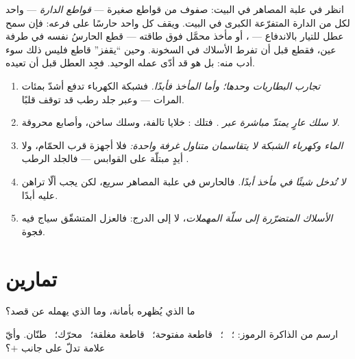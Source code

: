 \begin{remark}[حرّاس البيت]\label{rem:g6:circuits-and-safety:guards}
انظر في علبة المصاهر في البيت: صفوف من قواطع صغيرة ---
\emph{قواطع الدارة} --- واحد لكل  من الدارة المتفرّعة الكبرى
في البيت. ويقف كل واحد حارسًا على فرعه: فإن سمح عطل للتيار
بالاندفاع --- ، أو مأخذ محمَّل فوق طاقته --- قطع
الحارسُ نفسه في طرفة عين، فقطع  قبل أن تفرط الأسلاك في
السخونة. وحين ``يقفز'' قاطع فليس ذلك سوء أدب منه: بل هو قد
أدّى عمله الوحيد. فجِد العطل قبل أن تعيده.
\end{remark}

\begin{remark}\label{rem:g6:circuits-and-safety:rules}
\begin{enumerate}
  \item \emph{تجارب البطاريات وحدها؛ وأما المأخذ فأبدًا.} فشبكة
        الكهرباء تدفع أشدّ بمئات المرات --- وعبر جلد رطب قد
        توقف قلبًا.
  \item \emph{لا سلك عارٍ يمتدّ مباشرة عبر .} فتلك : خلايا تالفة، وسلك ساخن، وأصابع محروقة.
  \item \emph{الماء وكهرباء الشبكة لا يتقاسمان متناول غرفة
        واحدة:} فلا أجهزة قرب الحمّام، ولا أيدٍ مبتلّة على
        القوابس --- فالجلد الرطب .
  \item \emph{لا تُدخل شيئًا في مأخذ أبدًا.} فالحارس في علبة
        المصاهر سريع، لكن يجب ألّا تراهن عليه أبدًا.
  \item \emph{الأسلاك المتضرّرة إلى سلّة المهملات}، لا إلى
        الدرج: فالعزل المتشقّق سياج فيه فجوة.
\end{enumerate}
\end{remark}

\section{تمارين}

\begin{exercise}[$\star$]\label{exo:g6:circuits-and-safety:1}
ما الذي يُظهره  بأمانة، وما الذي يهمله عن قصد؟
\end{exercise}

\begin{exercise}[$\star$]\label{exo:g6:circuits-and-safety:2}
ارسم من الذاكرة الرموز: ؛ \ ؛ \ قاطعة مفتوحة؛
\ قاطعة مغلقة؛ \ محرّك؛ \ طنّان. وأيّ علامة تدلّ على جانب
 $+$؟
\end{exercise}

